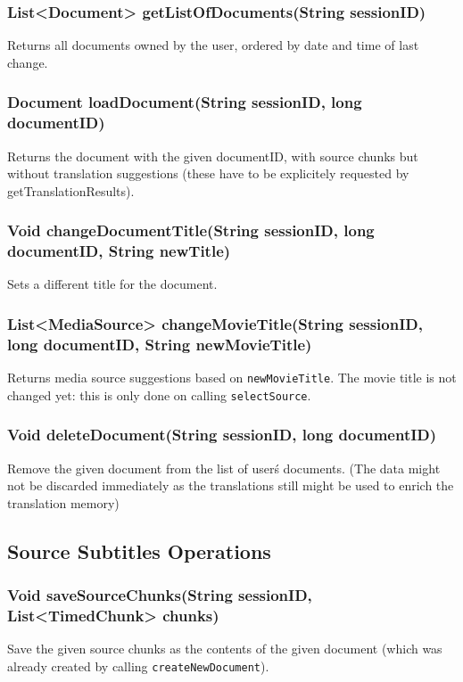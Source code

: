 {\subsubsection{List<Document> getListOfDocuments(String sessionID)}
Returns all documents owned by the user, ordered by date and time of last change.

\subsubsection{Document loadDocument(String sessionID, long documentID)}
Returns the document with the given documentID, with source chunks but without translation suggestions (these have to be explicitely requested by getTranslationResults).

\subsubsection{Void changeDocumentTitle(String sessionID, long documentID, String newTitle)}
Sets a different title for the document.

\subsubsection{List<MediaSource> changeMovieTitle(String sessionID, long documentID, String newMovieTitle)}
Returns media source suggestions based on {\tt newMovieTitle}.
The movie title is not changed yet:
this is only done on calling {\tt selectSource}.
     	
\subsubsection{Void deleteDocument(String sessionID, long documentID)}
Remove the given document from the list of user\'s documents.
(The data might not be discarded immediately
as the translations still might be used to enrich the translation memory)	 

\subsection{Source Subtitles Operations}

\subsubsection{Void saveSourceChunks(String sessionID, List<TimedChunk> chunks)}
Save the given source chunks as the contents of the given document
(which was already created by calling {\tt createNewDocument}).

}

